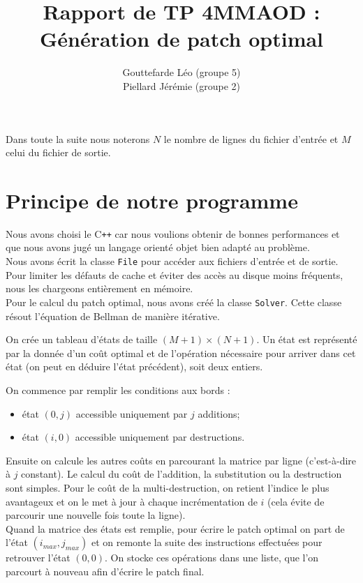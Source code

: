 \documentclass[a4paper, 10pt, french]{article}
\title{Rapport de TP 4MMAOD : Génération de patch optimal}
\author{
{\sc Gouttefarde} Léo (groupe 5)\\
{\sc Piellard} Jérémie (groupe 2)
}
\begin{document}
\maketitle

Dans toute la suite nous noterons $N$ le nombre de lignes du fichier d'entrée et $M$ celui du fichier de sortie.

\section{Principe de notre  programme}
Nous avons choisi le C\texttt{++} car nous voulions obtenir de bonnes performances
et que nous avons jugé un langage orienté objet bien adapté au problème.\\

Nous avons écrit la classe \texttt{File} pour accéder aux fichiers d'entrée et de sortie. Pour limiter les défauts de cache et éviter des accès au disque moins fréquents, nous les chargeons entièrement en mémoire.\\

Pour le calcul du patch optimal, nous avons créé la classe \texttt{Solver}.
Cette classe résout l'équation de Bellman de manière itérative.

On crée un tableau d'états de taille $(M+1)\times(N+1)$.
Un état est représenté par la donnée d'un coût optimal et de l'opération nécessaire pour arriver dans cet état
(on peut en déduire l'état précédent), soit deux entiers.

On commence par remplir les conditions aux bords :
\begin{itemize}
\item état $(0,j)$ accessible uniquement par $j$ additions;
\item état $(i,0)$ accessible uniquement par destructions.
\end{itemize}

Ensuite on calcule les autres coûts en parcourant la matrice par ligne
(c'est-à-dire à $j$ constant).
Le calcul du coût de l'addition, la substitution ou la destruction sont simples.
Pour le coût de la multi-destruction, on retient l'indice le plus avantageux
et on le met à jour à chaque incrémentation de $i$ (cela évite de parcourir une nouvelle fois toute la ligne).\\

Quand la matrice des états est remplie, pour écrire le patch optimal on part de l'état $(i_{max}, j_{max})$
et on remonte la suite des instructions effectuées pour retrouver l'état $(0,0)$.
On stocke ces opérations dans une liste, que l'on parcourt à nouveau afin d'écrire le patch final.
\end{document}
